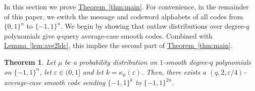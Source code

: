 \documentclass[11pt]{article}
\numberwithin{equation}{section}
\newtheorem{theorem}{Theorem}[section]
\theoremstyle{definition}
\theoremstyle{plain}
\newcommand{\expref}[2]{\hyperref[#2]{#1~\ref{#2}}}
\newcommand{\bset}[1]{\{0,1\}^{#1}} %
\newcommand{\pmset}[1]{\{-1,1\}^{#1}} %
\newcommand{\sBC}{{\{-1,1\}}}
\newcommand{\eps}{\varepsilon}
\begin{document}
In this section we prove \expref{Theorem}{thm:main}.
For convenience, in the remainder of this paper, we switch the message and codeword alphabets of all codes from $\bset{n}$ to $\pmset{n}$.
We begin by showing that outlaw distributions over degree-$q$ polynomials give $q$-query average-case smooth codes.
Combined with \expref{Lemma}{lem:ave2ldc}, this implies the second part of \expref{Theorem}{thm:main}.


\begin{theorem}
\label{thm:degq_dist2avg}
Let $\mu$ be a probability distribution on $1$-smooth degree-$q$ polynomials on $\sBC^n$, let $\eps \in (0,1]$ and let $k = \kappa_\mu(\eps)$. 
Then, there exists a $(q,2,\eps/4)$-average-case smooth code sending $\sBC^k$ to $\pmset{2n}$.
\end{theorem}
\end{document}
